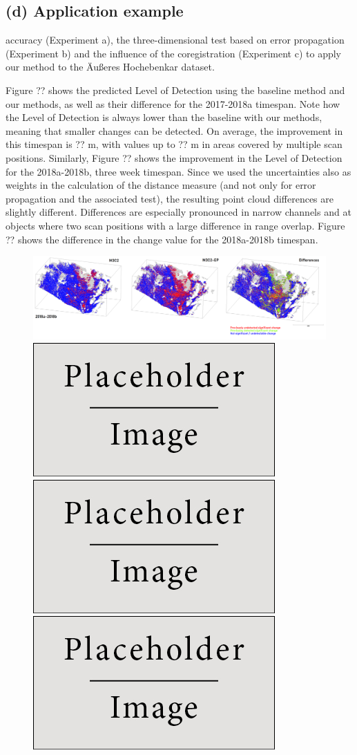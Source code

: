 \documentclass[preprint,12pt,3p]{elsarticle}
\begin{document}
\subsection{(d) Application example}
accuracy (Experiment a), the three-dimensional test based on error propagation (Experiment b) and the influence of the coregistration (Experiment c) to apply our method to the Äußeres Hochebenkar dataset.

Figure ?? shows the predicted Level of Detection using the baseline method and our methods, as well as their difference for the 2017-2018a timespan. Note how the Level of Detection is always lower than the baseline with our methods, meaning that smaller changes can be detected. On average, the improvement in this timespan is ?? m, with values up to ?? m in areas covered by multiple scan positions. Similarly, Figure ?? shows the improvement in the Level of Detection for the 2018a-2018b, three week timespan. 
Since we used the uncertainties also as weights in the calculation of the distance measure (and not only for error propagation and the associated test), the resulting point cloud differences are slightly different. Differences are especially pronounced in narrow channels and at objects where two scan positions with a large difference in range overlap. Figure ?? shows the difference in the change value for the 2018a-2018b timespan.
 
\begin{figure}
    \centering
    \includegraphics[width=0.9\linewidth]{figs/result_sig_change_2018ab.png}
    \includegraphics[width=0.3\linewidth]{placeholder.jpg}\includegraphics[width=0.3\linewidth]{placeholder.jpg}\includegraphics[width=0.3\linewidth]{placeholder.jpg}
    \caption{}
    \label{fig:plot_d}
\end{figure}
 
\end{document}
